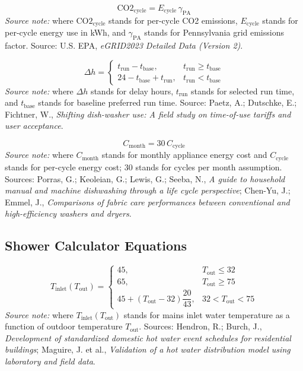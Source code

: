 \documentclass[12pt]{article}
\begin{document}
\begin{equation}
\label{eq:app_cycle_emissions}
\mathrm{CO2}_{\mathrm{cycle}} = E_{\mathrm{cycle}}\,\gamma_{\mathrm{PA}}
\end{equation}
\noindent\textit{Source note:} where $\mathrm{CO2}_{\mathrm{cycle}}$ stands for per-cycle CO2 emissions, $E_{\mathrm{cycle}}$ stands for per-cycle energy use in kWh, and $\gamma_{\mathrm{PA}}$ stands for Pennsylvania grid emissions factor. Source: U.S. EPA, \emph{eGRID2023 Detailed Data (Version 2)}.

\begin{equation}
\label{eq:app_delay_hours}
\Delta h =
\begin{cases}
t_{\mathrm{run}}-t_{\mathrm{base}}, & t_{\mathrm{run}}\ge t_{\mathrm{base}}\\
24-t_{\mathrm{base}}+t_{\mathrm{run}}, & t_{\mathrm{run}}<t_{\mathrm{base}}
\end{cases}
\end{equation}
\noindent\textit{Source note:} where $\Delta h$ stands for delay hours, $t_{\mathrm{run}}$ stands for selected run time, and $t_{\mathrm{base}}$ stands for baseline preferred run time. Source: Paetz, A.; Dutschke, E.; Fichtner, W., \emph{Shifting dish-washer use: A field study on time-of-use tariffs and user acceptance}.

\begin{equation}
\label{eq:app_monthly_cost}
C_{\mathrm{month}} = 30\,C_{\mathrm{cycle}}
\end{equation}
\noindent\textit{Source note:} where $C_{\mathrm{month}}$ stands for monthly appliance energy cost and $C_{\mathrm{cycle}}$ stands for per-cycle energy cost; $30$ stands for cycles per month assumption. Sources: Porras, G.; Keoleian, G.; Lewis, G.; Seeba, N., \emph{A guide to household manual and machine dishwashing through a life cycle perspective}; Chen-Yu, J.; Emmel, J., \emph{Comparisons of fabric care performances between conventional and high-efficiency washers and dryers}.

\subsection{Shower Calculator Equations}

\begin{equation}
\label{eq:shower_inlet_temp}
T_{\mathrm{inlet}}(T_{\mathrm{out}})=
\begin{cases}
45, & T_{\mathrm{out}}\le 32\\
65, & T_{\mathrm{out}}\ge 75\\
45 + (T_{\mathrm{out}}-32)\dfrac{20}{43}, & 32<T_{\mathrm{out}}<75
\end{cases}
\end{equation}
\noindent\textit{Source note:} where $T_{\mathrm{inlet}}(T_{\mathrm{out}})$ stands for mains inlet water temperature as a function of outdoor temperature $T_{\mathrm{out}}$. Sources: Hendron, R.; Burch, J., \emph{Development of standardized domestic hot water event schedules for residential buildings}; Maguire, J. et al., \emph{Validation of a hot water distribution model using laboratory and field data}.
\end{document}
